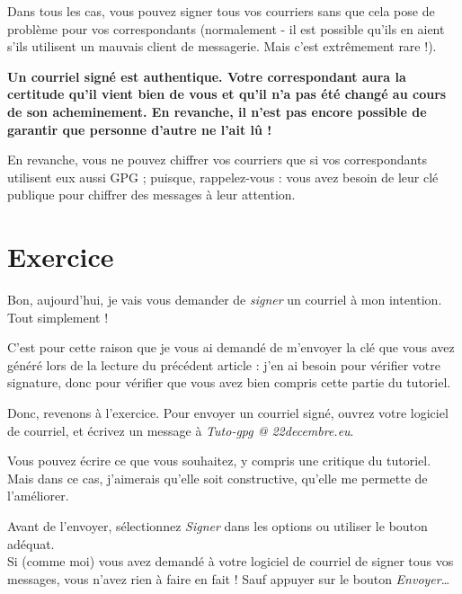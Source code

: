 Dans tous les cas, vous pouvez signer tous vos courriers sans que cela
pose de problème pour vos correspondants (normalement - il est possible
qu'ils en aient s'ils utilisent un mauvais client de messagerie. Mais
c'est extrêmement rare !).

\textbf{Un courriel signé est authentique. Votre correspondant aura la
certitude qu'il vient bien de vous et qu'il n'a pas été changé au cours
de son acheminement. En revanche, il n'est pas encore possible de
garantir que personne d'autre ne l'ait lû !}

En revanche, vous ne pouvez chiffrer vos courriers que si vos
correspondants utilisent eux aussi GPG ; puisque, rappelez-vous : vous
avez besoin de leur clé publique pour chiffrer des messages à leur
attention.

\section{Exercice}\label{exercice}

Bon, aujourd'hui, je vais vous demander de \emph{signer} un courriel à
mon intention. Tout simplement !

C'est pour cette raison que je vous ai demandé de m'envoyer la clé que
vous avez généré lors de la lecture du précédent article : j'en ai
besoin pour vérifier votre signature, donc pour vérifier que vous avez
bien compris cette partie du tutoriel.

Donc, revenons à l'exercice. Pour envoyer un courriel signé, ouvrez
votre logiciel de courriel, et écrivez un message à \emph{Tuto-gpg @
22decembre.eu}.

Vous pouvez écrire ce que vous souhaitez, y compris une critique du
tutoriel. Mais dans ce cas, j'aimerais qu'elle soit constructive,
qu'elle me permette de l'améliorer.

Avant de l'envoyer, sélectionnez \emph{Signer} dans les options ou
utiliser le bouton adéquat.\\Si (comme moi) vous avez demandé à votre
logiciel de courriel de signer tous vos messages, vous n'avez rien à
faire en fait ! Sauf appuyer sur le bouton \emph{Envoyer}\ldots{}
